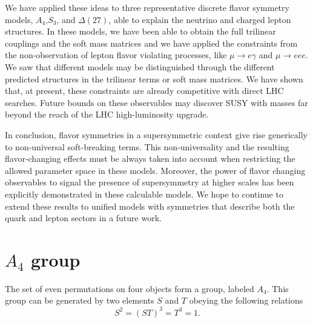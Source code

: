 \documentclass[a4paper,11pt]{article}
\begin{document}
We have applied these ideas to three representative discrete flavor symmetry models, $A_4$,$S_3$, and $\Delta(27)$, able to explain the neutrino and charged lepton structures. In these models, we have been able to obtain the full trilinear couplings and the soft mass matrices and we have applied the constraints from the non-observation of lepton flavor violating processes, like $\mu \to e \gamma$ and $\mu \to e e e$. We saw that different models may be distinguished through the different predicted structures in the trilinear terms or soft mass matrices. We have shown that, at present, these constraints are already competitive with direct LHC searches. Future bounds on these observables may discover SUSY with masses far beyond the reach of the LHC high-luminosity upgrade.

In conclusion, flavor symmetries in a supersymmetric context give rise generically to non-universal soft-breaking terms. This non-universality and the resulting flavor-changing effects must be always taken into account when restricting the allowed parameter space in these models. Moreover, the power of flavor changing observables to signal the presence of supersymmetry at higher scales has been explicitly demonstrated in these calculable models. We hope to continue to extend these results to unified models with symmetries that describe both the quark and lepton sectors in a future work. 
\appendix
\section{$A_4$ group}
\label{app:A4group}

The set of even permutations on four objects form a group, labeled $A_4$. This group can be generated by two elements $S$ and $T$ obeying the following relations 
\begin{equation}
S^2=(ST)^3=T^3=1.
\end{equation}
\end{document}
